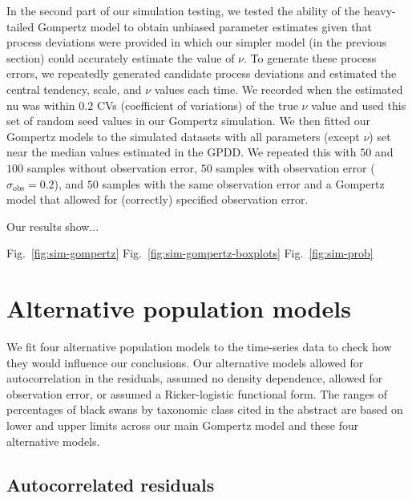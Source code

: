 In the second part of our simulation testing, we tested the ability of the heavy-tailed Gompertz model to obtain unbiased parameter estimates given that process deviations were provided in which our simpler model (in the previous section) could accurately estimate the value of $\nu$. To generate these process errors, we repeatedly generated candidate process deviations and estimated the central tendency, scale, and $\nu$ values each time. We recorded when the estimated nu was within $0.2$ CVs (coefficient of variations) of the true $\nu$ value and used this set of random seed values in our Gompertz simulation. We then fitted our Gompertz models to the simulated datasets with all parameters (except $\nu$) set near the median values estimated in the GPDD. We repeated this with $50$ and $100$ samples without observation error, $50$ samples with observation error ($\sigma_\mathrm{obs} = 0.2$), and $50$ samples with the same observation error and a Gompertz model that allowed for (correctly) specified observation error.

Our results show...

Fig.~\ref{fig:sim-gompertz}
Fig.~\ref{fig:sim-gompertz-boxplots}
Fig.~\ref{fig:sim-prob}


\section{Alternative population models}

We fit four alternative population models to the time-series data to check how they would influence our conclusions. Our alternative models allowed for autocorrelation in the residuals, assumed no density dependence, allowed for observation error, or assumed a Ricker-logistic functional form. The ranges of percentages of black swans by taxonomic class cited in the abstract are based on lower and upper limits across our main Gompertz model and these four alternative models.

\subsection{Autocorrelated residuals}

